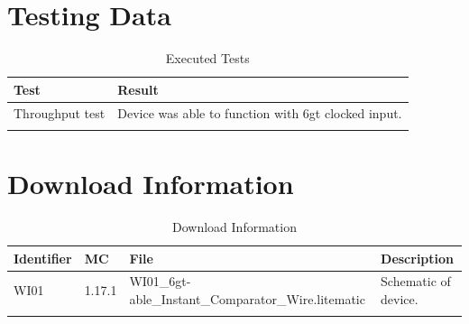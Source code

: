 \documentclass[10pt]{datasheet}
\begin{document}
\section{Testing Data}
\begin{table}[h]
\caption{Executed Tests}
\begin{tabularx}{\textwidth}{l | X}
    \thickhline
    \textbf{Test} & \textbf{Result} \\
    \hline
    Throughput test & Device was able to function with 6gt clocked input. \\
    \thickhline
\end{tabularx}
\end{table}

\section{Download Information}
\begin{table}[h]
    \caption{Download Information}
    \begin{tabularx}{\textwidth}{l | l | l | X}
        \thickhline
        \textbf{Identifier} & \textbf{MC} & \textbf{File} & \textbf{Description} \\
        \hline
        WI01 & 1.17.1 & WI01\_6gt-able\_Instant\_Comparator\_Wire.litematic & Schematic of device. \\
        \hline
        \thickhline
    \end{tabularx}
\end{table}
\end{document}
